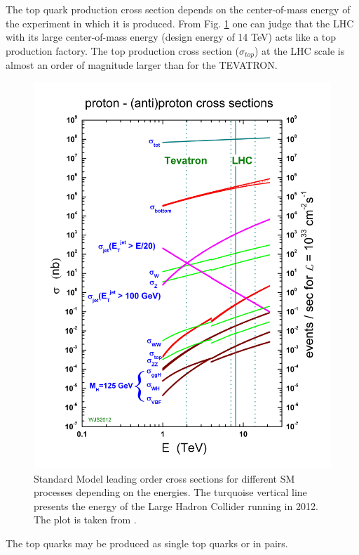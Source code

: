 The top quark production cross section depends on the center-of-mass energy of the experiment in which it is produced. From Fig. \ref{fig:SM_XSec_Prod}
one can judge that the LHC with its large center-of-mass energy (design energy of 14 TeV) acts like 
a top production factory. The top production cross section ($\sigma_{top}$) at the LHC scale is almost an order of magnitude larger than for the
TEVATRON.

\begin{figure}[p]
  \centering
  \includegraphics[width=1.0\textwidth]{01_Theory_SM/plots/crosssections2013.png}
  \caption{Standard Model leading order cross sections for different SM processes depending on the energies. The turquoise vertical line presents the energy
  of the Large Hadron Collider running in 2012. The plot is taken from \cite{Stirling}.}
  \label{fig:SM_XSec_Prod}
\end{figure}

The top quarks may be produced as single top quarks or in pairs.

